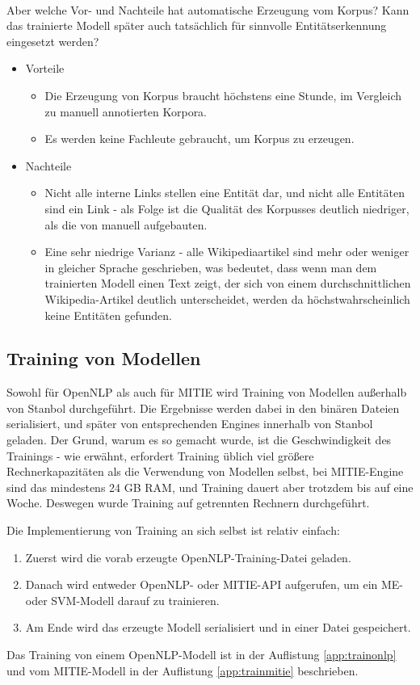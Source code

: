 \paragraph{}
Aber welche Vor- und Nachteile hat automatische Erzeugung vom Korpus? Kann das trainierte Modell später auch tatsächlich für sinnvolle Entitätserkennung eingesetzt werden?
\begin{itemize}
\item Vorteile
\begin{itemize}
\item Die Erzeugung von Korpus braucht höchstens eine Stunde, im Vergleich zu manuell annotierten Korpora.
\item Es werden keine Fachleute gebraucht, um Korpus zu erzeugen.
\end{itemize}
\item Nachteile
\begin{itemize}
\item Nicht alle interne Links stellen eine Entität dar, und nicht alle Entitäten sind ein Link - als Folge ist die Qualität des Korpusses deutlich niedriger, als die von manuell aufgebauten.
\item Eine sehr niedrige Varianz - alle Wikipediaartikel sind mehr oder weniger in gleicher Sprache geschrieben, was bedeutet, dass wenn man dem trainierten Modell einen Text zeigt, der sich von einem durchschnittlichen Wikipedia-Artikel deutlich unterscheidet, werden da höchstwahrscheinlich keine Entitäten gefunden.
\end{itemize}
\end{itemize}

\subsection{Training von Modellen}
Sowohl für OpenNLP als auch für MITIE wird Training von Modellen außerhalb von Stanbol durchgeführt. Die Ergebnisse werden dabei in den binären Dateien serialisiert, und später von entsprechenden Engines innerhalb von Stanbol geladen. Der Grund, warum es so gemacht wurde, ist die Geschwindigkeit des Trainings - wie erwähnt, erfordert Training üblich viel größere Rechnerkapazitäten als die Verwendung von Modellen selbst, bei MITIE-Engine sind das mindestens 24 GB RAM, und Training dauert aber trotzdem bis auf eine Woche. Deswegen wurde Training auf getrennten Rechnern durchgeführt.

Die Implementierung von Training an sich selbst ist relativ einfach: 
\begin{enumerate}
\item Zuerst wird die vorab erzeugte OpenNLP-Training-Datei geladen.
\item Danach wird entweder OpenNLP- oder MITIE-API aufgerufen, um ein ME- oder SVM-Modell darauf zu trainieren.
\item Am Ende wird das erzeugte Modell serialisiert und in einer Datei gespeichert.
\end{enumerate}
Das Training von einem OpenNLP-Modell ist in der Auflistung \ref{app:trainonlp} und vom MITIE-Modell in der Auflistung \ref{app:trainmitie} beschrieben.

